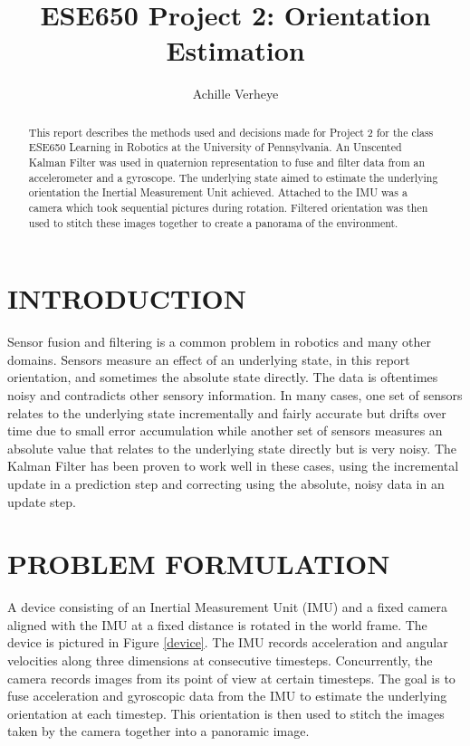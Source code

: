 \documentclass[letterpaper, 10 pt, conference]{ieeeconf}  %
\title{\LARGE \bf
ESE650 Project 2: Orientation Estimation
}
\author{Achille Verheye%
}
\begin{document}
\maketitle
\thispagestyle{empty}
\pagestyle{empty}


\begin{abstract}

This report describes the methods used and decisions made for Project 2 for the class ESE650 Learning in Robotics at the University of Pennsylvania. An Unscented Kalman Filter was used in quaternion representation to fuse and filter data from an accelerometer and a gyroscope. The underlying state aimed to estimate the underlying orientation the Inertial Measurement Unit achieved. Attached to the IMU was a camera which took sequential pictures during rotation. Filtered orientation was then used to stitch these images together to create a panorama of the environment.

\end{abstract}


\section{INTRODUCTION}
Sensor fusion and filtering is a common problem in robotics and many other domains. Sensors measure an effect of an underlying state, in this report orientation, and sometimes the absolute state directly. The data is oftentimes noisy and contradicts other sensory information. In many cases, one set of sensors relates to the underlying state incrementally and fairly accurate but drifts over time due to small error accumulation while another set of sensors measures an absolute value that relates to the underlying state directly but is very noisy. The Kalman Filter has been proven to work well in these cases, using the incremental update in a prediction step and correcting using the absolute, noisy data in an update step.

\section{PROBLEM FORMULATION}
A device consisting of an Inertial Measurement Unit (IMU) and a fixed camera aligned with the IMU at a fixed distance is rotated in the world frame. The device is pictured in Figure \ref{device}. The IMU records acceleration and angular velocities along three dimensions at consecutive timesteps. Concurrently, the camera records images from its point of view at certain timesteps. The goal is to fuse acceleration and gyroscopic data from the IMU to estimate the underlying orientation at each timestep. This orientation is then used to stitch the images taken by the camera together into a panoramic image.
\end{document}
